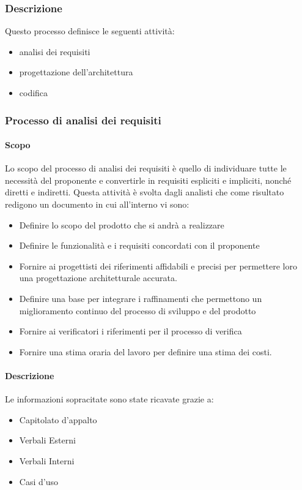 \subsubsection{Descrizione}
Questo processo definisce le seguenti attività:
\begin{itemize}
  \item analisi dei requisiti
  \item progettazione dell'architettura
  \item codifica
\end{itemize}
\subsubsection{Processo di analisi dei requisiti}
\label{_processoAnalisiDeiRequisiti}
\paragraph{Scopo}
Lo scopo del processo di analisi dei requisiti è quello di individuare tutte le necessità del proponente e convertirle in requisiti espliciti e impliciti, nonché diretti e indiretti. Questa attività è svolta dagli analisti che come risultato redigono un documento in cui all'interno vi sono:
\begin{itemize}
  \item Definire lo scopo del prodotto che si andrà a realizzare
  \item Definire le funzionalità e i requisiti concordati con il proponente
  \item Fornire ai progettisti dei riferimenti affidabili e precisi per permettere loro una progettazione architetturale accurata.
  \item Definire una base per integrare i raffinamenti che permettono un miglioramento continuo del processo di sviluppo e del prodotto
  \item Fornire ai verificatori i riferimenti per il processo di verifica
  \item Fornire una stima oraria del lavoro per definire una stima dei costi.
\end{itemize}

\paragraph{Descrizione}
Le informazioni sopracitate sono state ricavate grazie a:
\begin{itemize}
  \item Capitolato d'appalto
  \item Verbali Esterni
  \item Verbali Interni
  \item Casi d'uso
\end{itemize}


